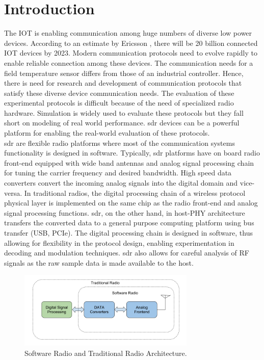 \chapter{Introduction}
The \ac{IOT} is enabling communication among huge numbers of diverse low power devices.  
According to an estimate by Ericsson \cite{noauthor_internet_2017}, there will be 20 billion connected \ac{IOT} devices by 2023.
Modern communication protocols need to evolve rapidly to enable reliable connection among these devices.
The communication needs for a field temperature sensor differs from those of an industrial controller. 
Hence, there is need for research and development of communication protocols that satisfy these diverse device communication needs. 
The evaluation of these experimental protocols is difficult because of the need of specialized radio hardware.
Simulation is widely used to evaluate these protocols but they fall short on modeling of real world performance.
\ac{sdr} devices can be a powerful platform for enabling the real-world evaluation of these protocols.\\

\ac{sdr} are flexible radio platforms where most of the communication systems functionality is designed in software. Typically, \ac{sdr} platforms have on board radio front-end equipped with wide band antennas and analog signal processing chain for tuning the carrier frequency and desired bandwidth. High speed data converters convert the incoming analog signals into the digital domain and vice-versa. In traditional radios, the digital processing chain of a wireless protocol physical layer is implemented on the same chip as the radio front-end and analog signal processing functions. \ac{sdr}, on the other hand, in host-PHY \cite{nychis_enabling_nodate} architecture transfers the converted data to a general purpose computing platform using bus transfer (USB, PCIe).  The digital processing chain is designed in software, thus allowing for flexibility in the protocol design, enabling experimentation in decoding and modulation techniques. \ac{sdr} also allows for careful analysis of RF signals as the raw sample data is made available to the host.\\

\begin{figure}[!h]
\centering
\includegraphics[width=0.75\textwidth]{Figure/SDRSystem.png}
\caption{Software Radio and Traditional Radio Architecture.}
\label{sdr_architecture}
\end{figure}


